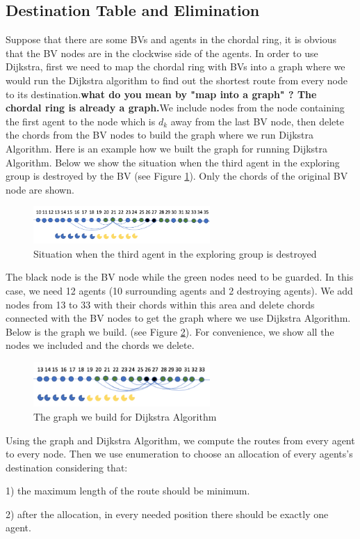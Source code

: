 \subsection{Destination Table and Elimination}
Suppose that there are some BVs and agents in the chordal ring, it is obvious that the BV nodes are in the clockwise side of the agents. In order to use Dijkstra, first we need to map the chordal ring with BVs into a graph where we would run the Dijkstra algorithm to find out the shortest route from every node to its destination.{\bf what do you mean by "map into a graph" ? The chordal ring is already a graph.}We include nodes from the node containing the first agent to the node which is $d_k$ away from the last BV node, then delete the chords from the BV nodes to build the graph where we run Dijkstra Algorithm.
Here is an example how we built the graph for running Dijkstra Algorithm. Below we show the situation when the third agent in the exploring group is destroyed by the BV (see Figure \ref{fig:D1}). Only the chords of the original BV node are shown. 
\begin{figure}[H]
  \centering  
  \includegraphics[width=0.6\textwidth]{figures/D1.png}
  \caption{Situation when the third agent in the exploring group is destroyed}\label{fig:D1}
\end{figure} 

The black node is the BV node while the green nodes need to be guarded. In this case, we need 12 agents (10 surrounding agents and 2 destroying agents). 
We add nodes from 13 to 33 with their chords within this area and delete chords connected with the BV nodes to get the graph where we use Dijkstra Algorithm. Below is the graph we build. (see Figure  \ref{fig:D2}). For convenience, we show   all the nodes we included and the chords we delete.
\begin{figure}[H]
  \centering  
  \includegraphics[width=0.6\textwidth]{figures/D2.png}
  \caption{The graph we build for Dijkstra Algorithm}\label{fig:D2}
\end{figure} 
Using the graph and Dijkstra Algorithm, we compute the routes from every agent to every node. Then we use enumeration to choose an allocation of every agents's destination considering that: 
\begin{description}
\item 1) the maximum length of the route should be minimum. 
\item 2) after the allocation, in every needed position there should be exactly one agent.
\end{description}

